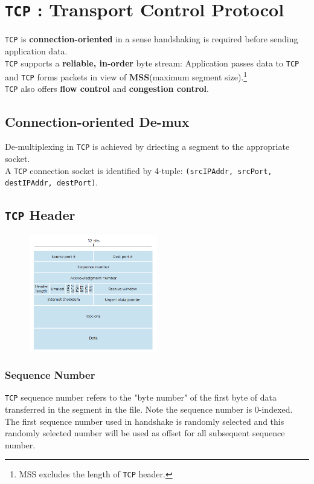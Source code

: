 \documentclass[12pt]{article}
\newcommand\TCP{\texttt{TCP} }
\theoremstyle{definition}
\begin{document}
\section{\TCP: Transport Control Protocol}
\TCP is \textbf{connection-oriented} in a sense handshaking is required before sending application data. \\\TCP supports a \textbf{reliable, in-order} byte stream: Application passes data to \TCP and \TCP forms packets in view of \textbf{MSS}(maximum segment size).\footnote{MSS excludes the length of \TCP header.}\\\TCP also offers \textbf{flow control} and \textbf{congestion control}.
\subsection{Connection-oriented De-mux}
De-multiplexing in \TCP is achieved by driecting a segment to the appropriate socket.\\A \TCP connection socket is identified by 4-tuple: \texttt{(srcIPAddr, srcPort, destIPAddr, destPort)}.
\subsection{\TCP Header}
\begin{figure}[h]
\centering
\includegraphics[width = 0.5\textwidth]{5_1_1.png}
\end{figure}
\subsubsection{Sequence Number}
\TCP sequence number refers to the "byte number" of the first byte of data transferred in the segment in the file. Note the sequence number is $0$-indexed.\\The first sequence number used in handshake is randomly selected and this randomly selected number will be used as offset for all subsequent sequence number.
\end{document}
